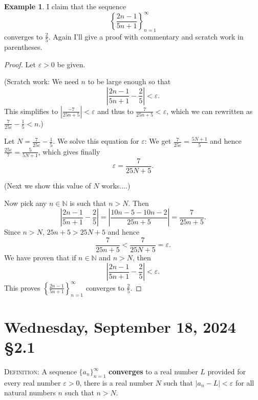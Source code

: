 \documentclass[12pt]{amsart}
\def\We{Wednesday}
\def\e{\varepsilon}
\newcommand{\N}{\mathbb{N}}
\numberwithin{equation}{section}
\theoremstyle{plain} %
\newcommand{\Sept}[3]{\section{#2, September #1, 2024 \quad \S#3}}
\theoremstyle{definition}
\newtheorem{ex}[equation]{Example}
\theoremstyle{remark}
\begin{document}
\begin{ex} I claim that the sequence
$$
\left\{ \frac{2n - 1}{5n + 1} \right\}_{n=1}^\infty
$$
converges to $\frac{2}{5}$.  Again I'll give a proof with commentary and scratch work in parentheses.

\begin{proof} 
Let $\e > 0$ be given. 

(Scratch work: We need $n$ to be large enough so that
$$
\left|\frac{2n - 1}{5n + 1} - \frac{2}{5}\right| < \e.
$$
This simplifies to 
$\left|\frac{-7}{25n + 5}\right| < \e$
and thus to
$\frac{7}{25n + 5} < \e$, which we can rewritten as $\frac{7}{25\e} - \frac15 < n$.)

Let $N = \frac{7}{25\e} - \frac15$. We solve this equation for $\e$: We get
$\frac{7}{25 \e} = \frac{5N +  1}{5}$ and hence 
$\frac{25 \e}{7} = \frac{5}{5N +  1}$, which gives finally
$$
\e = \frac{7}{25N + 5}.
$$

(Next we show this value of $N$ works....)

Now pick any $n \in \N$ is such that
$n > N$. Then
$$
\left|\frac{2n - 1}{5n + 1} - \frac{2}{5}\right| 
= \left|\frac{10n - 5   - 10n -2               }{25n + 5} \right| 
=  \frac{7}{25n + 5}.
$$
Since $n > N$, $25n + 5> 25N + 5$ and hence
$$
\frac{7}{25n + 5} < \frac{7}{25N + 5} = \e.
$$
We have proven that if $n \in \N$ and $n > N$, then
$$
\left|\frac{2n - 1}{5n + 1} - \frac{2}{5}\right| < \e.
$$
This proves $\left\{ \frac{2n - 1}{5n + 1} \right\}_{n=1}^\infty$
converges to $\frac25$.
\end{proof}
\end{ex}




\newpage
\Sept{18}{\We}{2.1}


\begin{framed}
\noindent \textsc{Definition:} A sequence $\{a_n\}_{n=1}^\infty$ {\bf converges} to a real number $L$ provided for every real number $\e > 0$, there is a real number $N$ such that ${|a_n - L| < \e}$ for all natural numbers $n$ such that $n > N$.
\end{framed}
\end{document}
